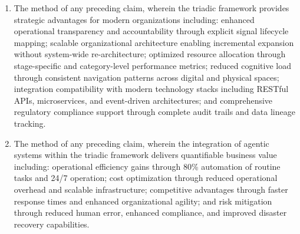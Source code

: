 \documentclass[11pt,a4paper]{article}
\begin{document}
\begin{enumerate}
  \item The method of any preceding claim, wherein the triadic framework provides strategic advantages for modern organizations including: enhanced operational transparency and accountability through explicit signal lifecycle mapping; scalable organizational architecture enabling incremental expansion without system-wide re-architecture; optimized resource allocation through stage-specific and category-level performance metrics; reduced cognitive load through consistent navigation patterns across digital and physical spaces; integration compatibility with modern technology stacks including RESTful APIs, microservices, and event-driven architectures; and comprehensive regulatory compliance support through complete audit trails and data lineage tracking.

  \item The method of any preceding claim, wherein the integration of agentic systems within the triadic framework delivers quantifiable business value including: operational efficiency gains through 80\% automation of routine tasks and 24/7 operation; cost optimization through reduced operational overhead and scalable infrastructure; competitive advantages through faster response times and enhanced organizational agility; and risk mitigation through reduced human error, enhanced compliance, and improved disaster recovery capabilities.
\end{enumerate}
\end{document}
